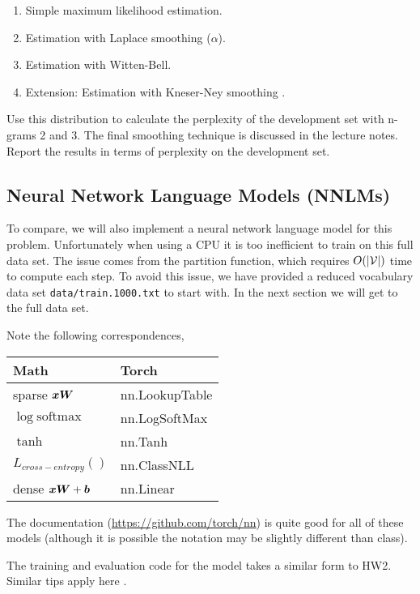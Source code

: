 \documentclass[11pt]{article}
\begin{document}
\begin{enumerate}
\item Simple maximum likelihood estimation. 
\item Estimation with Laplace smoothing ($\alpha$).
\item Estimation with Witten-Bell.
\item Extension: Estimation with Kneser-Ney smoothing . 
\end{enumerate}

Use this distribution to calculate the perplexity of the development
set with n-grams 2 and 3. The final smoothing technique is
discussed in the lecture notes. Report the results in terms of
perplexity on the development set.


\subsection{Neural Network Language Models (NNLMs)}

To compare, we will also implement a neural network language model for
this problem. Unfortunately when using a CPU it is too inefficient to
train on this full data set. The issue comes from the partition
function, which requires $O(|\mathcal{V}|)$ time to compute each step. To
avoid this issue, we have provided a reduced vocabulary data set
\texttt{data/train.1000.txt} to start with. In the next section we 
will get to the full data set.

Note the following correspondences,

\begin{center}
  \begin{tabular}{ll}
    \toprule
    Math & Torch \\
    \midrule 
    sparse $\boldsymbol{x} \boldsymbol{W}$ & nn.LookupTable \\ 
    $\log \mathrm{softmax}$ & nn.LogSoftMax \\ 
    $\tanh $ & nn.Tanh \\ 
    $L_{cross-entropy}()$ & nn.ClassNLL \\ 
    dense $\boldsymbol{x} \boldsymbol{W} + \boldsymbol{b}$ & nn.Linear \\ 
    \bottomrule
  \end{tabular}
\end{center}
The documentation (\url{https://github.com/torch/nn}) is quite good
for all of these models (although it is possible the notation may be
slightly different than class).

The training and evaluation code for the model takes a similar form to
HW2. Similar tips apply here .
 
\end{document}

